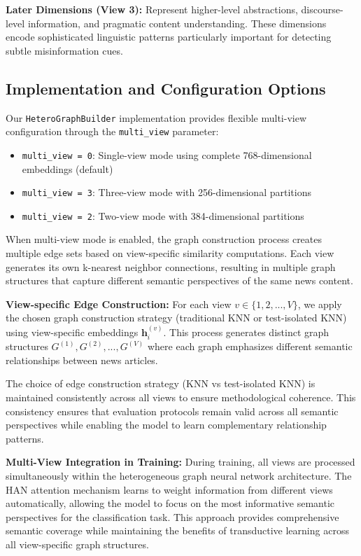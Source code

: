 \textbf{Later Dimensions (View 3):} Represent higher-level abstractions, discourse-level information, and pragmatic content understanding. These dimensions encode sophisticated linguistic patterns particularly important for detecting subtle misinformation cues.

\subsection{Implementation and Configuration Options}

Our \texttt{HeteroGraphBuilder} implementation provides flexible multi-view configuration through the \texttt{multi\_view} parameter:
\begin{itemize}
\item \texttt{multi\_view = 0}: Single-view mode using complete 768-dimensional embeddings (default)
\item \texttt{multi\_view = 3}: Three-view mode with 256-dimensional partitions
\item \texttt{multi\_view = 2}: Two-view mode with 384-dimensional partitions
\end{itemize}

When multi-view mode is enabled, the graph construction process creates multiple edge sets based on view-specific similarity computations. Each view generates its own k-nearest neighbor connections, resulting in multiple graph structures that capture different semantic perspectives of the same news content.

\textbf{View-specific Edge Construction:} For each view $v \in \{1, 2, ..., V\}$, we apply the chosen graph construction strategy (traditional KNN or test-isolated KNN) using view-specific embeddings $\mathbf{h}_i^{(v)}$. This process generates distinct graph structures $G^{(1)}, G^{(2)}, ..., G^{(V)}$ where each graph emphasizes different semantic relationships between news articles.

The choice of edge construction strategy (KNN vs test-isolated KNN) is maintained consistently across all views to ensure methodological coherence. This consistency ensures that evaluation protocols remain valid across all semantic perspectives while enabling the model to learn complementary relationship patterns.

\textbf{Multi-View Integration in Training:} During training, all views are processed simultaneously within the heterogeneous graph neural network architecture. The HAN attention mechanism learns to weight information from different views automatically, allowing the model to focus on the most informative semantic perspectives for the classification task. This approach provides comprehensive semantic coverage while maintaining the benefits of transductive learning across all view-specific graph structures.

